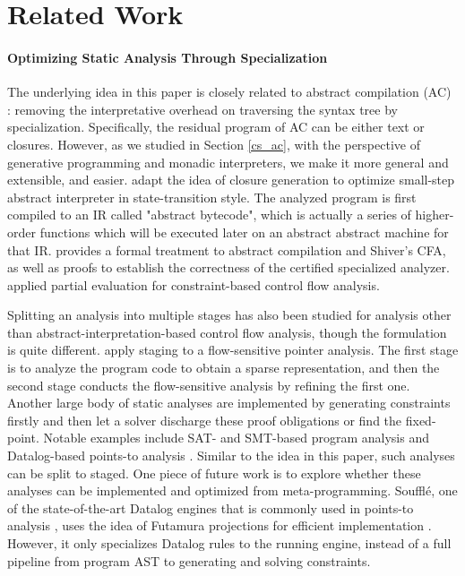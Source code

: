 \section{Related Work}

\paragraph{Optimizing Static Analysis Through Specialization}
The underlying idea in this paper is closely related to abstract
compilation (AC) \cite{Boucher:1996:ACN:647473.727587}: removing the
interpretative overhead on traversing the syntax tree by
specialization. Specifically, the residual program of AC can be either
text or closures. However, as we studied in Section \ref{cs_ac},
with the perspective of generative programming and monadic
interpreters, we make it more general and extensible, and easier.
\citet{Johnson:2013:OAA:2500365.2500604} adapt the idea of closure
generation to optimize small-step abstract interpreter in
state-transition style. The analyzed program is first compiled to an
IR called "abstract bytecode", which is actually a series of higher-order
functions which will be executed later on an abstract abstract machine
for that IR. \citet{damian1999partial} provides a formal treatment to
abstract compilation and Shiver's CFA, as well as proofs to establish
the correctness of the certified specialized analyzer.
\citet{amtoft1999partial} applied partial evaluation for
constraint-based control flow analysis.

Splitting an analysis into multiple stages has also been studied for
analysis other than abstract-interpretation-based control flow
analysis, though the formulation is quite
different. \citet{DBLP:conf/cgo/HardekopfL11} apply staging to a
flow-sensitive pointer analysis. The first stage is to analyze the
program code to obtain a sparse representation, and then the second
stage conducts the flow-sensitive analysis by refining the first
one. Another large body of static analyses are implemented by
generating constraints firstly and then let a solver discharge these
proof obligations or find the fixed-point. Notable examples include
SAT- and SMT-based program analysis
\cite{Gulwani:2008:PAC:1375581.1375616} and Datalog-based points-to
analysis \cite{Smaragdakis:2015:PA:2802194.2802195}.
Similar to the idea in this paper, such analyses can be split to
staged.  One piece of future work is to explore whether these
analyses can be implemented and optimized from
meta-programming. Souffl{\'e}, one of the state-of-the-art Datalog
engines that is commonly used in points-to analysis
\cite{Antoniadis:2017:PDS:3088515.3088522}, uses the idea of Futamura
projections for efficient implementation \cite{10.1007/978-3-319-41540-6_23}.
However, it only specializes Datalog rules to the running engine, instead
of a full pipeline from program AST to generating and
solving constraints.

